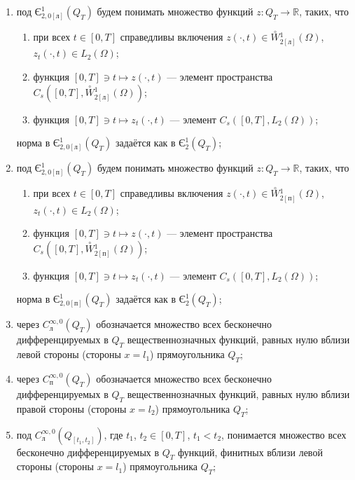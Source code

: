 \documentclass{report}
\begin{document}
{\begin{enumerate}
    \item
под $\textrm{Є}^1_{2,0[\textrm{л}]}(Q_T)$ будем понимать множество функций $z:Q_T\to\mathbb{R}$, таких, что
\begin{enumerate}
    \item
при всех $t\in[0,T]$ справедливы включения $z(\cdot,t)\in\stackrel{\circ}{W}\!\!^1_{2[\textrm{л}]}(\Omega)$, $z_t(\cdot,t)\in L_2(\Omega)$;
    \item
функция $[0,T]\ni t\mapsto z(\cdot,t)$ --- элемент пространства $C_s([0,T],\stackrel{\circ}{W}\!\!^1_{2[\textrm{л}]}(\Omega))$;
    \item
функция  $[0,T]\ni t\mapsto z_t(\cdot,t)$ --- элемент $C_s([0,T],L_2(\Omega))$;
\end{enumerate}
норма в  $\textrm{Є}^1_{2,0[\textrm{л}]}(Q_T)$ задаётся как в $\textrm{Є}^1_{2}(Q_T)$;

    \item
под $\textrm{Є}^1_{2,0[\textrm{п}]}(Q_T)$ будем понимать множество функций $z:Q_T\to\mathbb{R}$, таких, что
\begin{enumerate}
    \item
при всех $t\in[0,T]$ справедливы включения $z(\cdot,t)\in\stackrel{\circ}{W}\!\!^1_{2[\textrm{п}]}(\Omega)$, $z_t(\cdot,t)\in L_2(\Omega)$;
    \item
функция $[0,T]\ni t\mapsto z(\cdot,t)$ --- элемент пространства $C_s([0,T],\stackrel{\circ}{W}\!\!^1_{2[\textrm{п}]}(\Omega))$;
    \item
функция  $[0,T]\ni t\mapsto z_t(\cdot,t)$ --- элемент $C_s([0,T],L_2(\Omega))$;
\end{enumerate}
норма в  $\textrm{Є}^1_{2,0[\textrm{п}]}(Q_T)$ задаётся как в $\textrm{Є}^1_{2}(Q_T)$;

    \item
через $C^{\infty,0}_{\textrm{л}}(Q_T)$ обозначается множество всех бесконечно дифференцируемых в $Q_T$ вещественнозначных функций, равных нулю вблизи левой стороны (стороны $x=l_1$)
прямоугольника $Q_T$;

    \item
через $C^{\infty,0}_{\textrm{п}}(Q_T)$ обозначается множество всех бесконечно дифференцируемых в $Q_T$ вещественнозначных функций, равных нулю вблизи
правой стороны (стороны $x=l_2$) прямоугольника $Q_T$;

    \item
под $C^{\infty,0}_{\textrm{л}}(Q_{[t_1,t_2]})$, где $t_1$, $t_2\in[0,T]$, $t_1<t_2$, понимается множество всех бесконечно дифференцируемых в $Q_T$
функций, финитных вблизи левой стороны (стороны $x=l_1$) прямоугольника $Q_T$;


\end{enumerate}}
\end{document}

